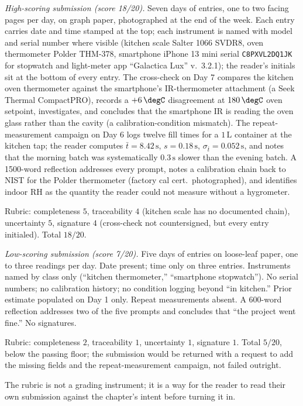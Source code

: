 \begin{project}
\textit{High-scoring submission (score 18/20).}
Seven days of entries, one to two facing pages per day, on graph
paper, photographed at the end of the week. Each entry carries
date and time stamped at the top; each instrument is named with
model and serial number where visible (kitchen scale Salter 1066
SVDR8, oven thermometer Polder THM-378, smartphone iPhone 13 mini
serial \texttt{C8PXVL2DQ1JK} for stopwatch and light-meter app
``Galactica Lux'' v.\ 3.2.1); the reader's initials sit at the
bottom of every entry. The cross-check on Day 7 compares the
kitchen oven thermometer against the smartphone's IR-thermometer
attachment (a Seek Thermal CompactPRO), records a
$+6 \,\degC$ disagreement at $180 \,\degC$ oven setpoint,
investigates, and concludes that the smartphone IR is reading
the oven glass rather than the cavity (a calibration-condition
mismatch). The repeat-measurement campaign on Day 6 logs twelve
fill times for a $1 \,\si{\liter}$ container at the kitchen tap;
the reader computes $\bar t = 8.42 \,\si{\second}$, $s = 0.18
\,\si{\second}$, $\sigma_{\bar t} = 0.052 \,\si{\second}$, and
notes that the morning batch was systematically $0.3
\,\si{\second}$ slower than the evening batch. A 1500-word
reflection addresses every prompt, notes a calibration chain
back to NIST for the Polder thermometer (factory cal cert.\
photographed), and identifies indoor RH as the quantity the
reader could not measure without a hygrometer.

Rubric: completeness $5$, traceability $4$ (kitchen scale has no
documented chain), uncertainty $5$, signature $4$ (cross-check
not countersigned, but every entry initialed). Total $18/20$.

\textit{Low-scoring submission (score 7/20).}
Five days of entries on loose-leaf paper, one to three readings
per day. Date present; time only on three entries. Instruments
named by class only (``kitchen thermometer,'' ``smartphone
stopwatch''). No serial numbers; no calibration history; no
condition logging beyond ``in kitchen.'' Prior estimate populated
on Day 1 only. Repeat measurements absent. A 600-word reflection
addresses two of the five prompts and concludes that ``the
project went fine.'' No signatures.

Rubric: completeness $2$, traceability $1$, uncertainty $1$,
signature $1$. Total $5/20$, below the passing floor; the
submission would be returned with a request to add the missing
fields and the repeat-measurement campaign, not failed outright.

The rubric is not a grading instrument; it is a way for the
reader to read their own submission against the chapter's
intent before turning it in.
\end{project}

